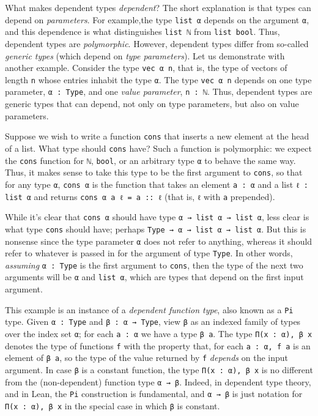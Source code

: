 \documentclass[11pt]{amsart}  %
\begin{document}
What makes dependent types \emph{dependent}? %
The short explanation is that types can depend on \emph{parameters}. For example,the type \lstinline{list α} depends on the argument \lstinline{α}, and this dependence is what distinguishes \lstinline{list ℕ} from \lstinline{list bool}. Thus, dependent types are \emph{polymorphic}.  However, dependent types differ from so-called \emph{generic types} (which depend on \emph{type parameters}).  Let us demonstrate with another example.  
Consider the type \lstinline{vec α n}, that is, the type of vectors of length 
\lstinline{n} whose entries inhabit the type \lstinline{α}. The type \lstinline{vec α n} depends on one type parameter, \lstinline{α : Type}, and one \emph{value parameter}, \lstinline{n : ℕ}.  Thus, dependent types are generic types that can depend, not only on type parameters, but also on value parameters.

Suppose we wish to write a function \lstinline{cons} that inserts a new element at the head of a list. What type should \lstinline{cons} have? Such a function is polymorphic: we expect the \lstinline{cons} function for \lstinline{ℕ}, \lstinline{bool}, or an arbitrary type \lstinline{α} to behave the same way. Thus, it makes sense to take this type to be the first argument to \lstinline{cons}, so that for any type \lstinline{α}, \lstinline{cons α} is the function that takes an element \lstinline{a : α} and a list 
\lstinline{ℓ : list α} and returns \lstinline{cons α a ℓ = a :: ℓ} 
(that is, \lstinline{ℓ} with \lstinline{a} prepended).

While it's clear that \lstinline{cons α} should have type \lstinline{α → list α → list α}, less clear is what type \lstinline{cons} should have; perhaps \lstinline{Type → α → list α → list α}. But this is nonsense since the type parameter \lstinline{α} does not refer to anything, whereas it should refer to whatever is passed in for the argument of type \lstinline{Type}. In other words, \emph{assuming} \lstinline{α : Type} is the first argument to \lstinline{cons}, then the type of the next two arguments will be \lstinline{α} and \lstinline{list α}, which are types that depend on the first input argument. 

This example is an instance of a \emph{dependent function type}, also known as a \lstinline{Pi} type. Given \lstinline{α : Type} and \lstinline{β : α → Type},
view \lstinline{β} as an indexed family of types over the index set \lstinline{α}; for each \lstinline{a : α} we have a type \lstinline{β a}.  The type \lstinline{Π(x : α), β x} denotes the type of functions \lstinline{f} with the property that, for each \lstinline{a : α, f a} is an element of \lstinline{β a}, so the type of the value returned by \lstinline{f} \emph{depends} on the input argument. In case \lstinline{β} is a constant function, the type \lstinline{Π(x : α), β x} is no different from the (non-dependent) function type \lstinline{α → β}. Indeed, in dependent type theory, and in Lean, the \lstinline{Pi} construction is fundamental, and \lstinline{α → β} is just notation for \lstinline{Π(x : α), β x} in the special case in which \lstinline{β} is constant.
\end{document}
